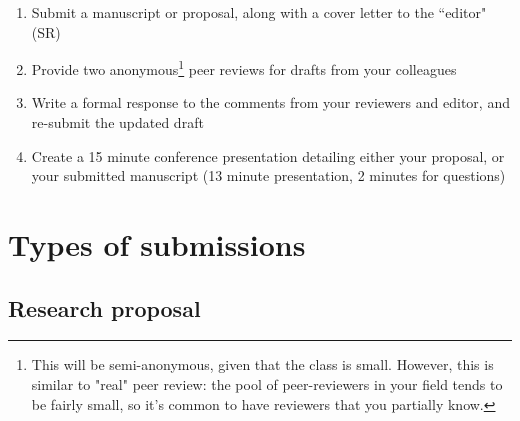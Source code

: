 \documentclass[11pt]{article}
\begin{document}
\begin{enumerate}
\item Submit a manuscript or proposal, along with a cover letter to the ``editor" (SR)
\item Provide two anonymous\footnote{This will be semi-anonymous, given that the class is small. However, this is similar to "real" peer review: the pool of peer-reviewers in your field tends to be fairly small, so it's common to have reviewers that you partially know.} peer reviews for drafts from your colleagues
\item Write a formal response to the comments from your reviewers and editor, and re-submit the updated draft
\item Create a 15 minute conference presentation detailing either your proposal, or your submitted manuscript (13 minute presentation, 2 minutes for questions)
\end{enumerate}

\section*{Types of submissions}

\subsection*{Research proposal}
\end{document}
